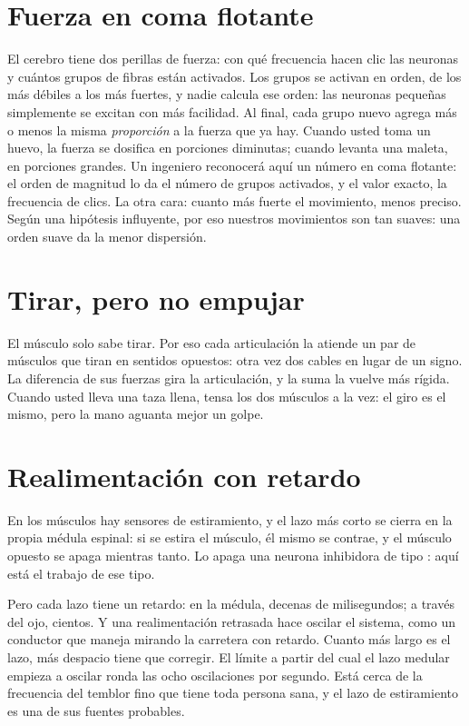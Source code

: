\section*{Fuerza en coma flotante}

El cerebro tiene dos perillas de fuerza: con qué frecuencia hacen clic las neuronas y cuántos grupos de fibras están activados. Los grupos se activan en orden, de los más débiles a los más fuertes, y nadie calcula ese orden: las neuronas pequeñas simplemente se excitan con más facilidad. Al final, cada grupo nuevo agrega más o menos la misma \emph{proporción} a la fuerza que ya hay. Cuando usted toma un huevo, la fuerza se dosifica en porciones diminutas; cuando levanta una maleta, en porciones grandes. Un ingeniero reconocerá aquí un número en coma flotante: el orden de magnitud lo da el número de grupos activados, y el valor exacto, la frecuencia de clics. La otra cara: cuanto más fuerte el movimiento, menos preciso. Según una hipótesis influyente, por eso nuestros movimientos son tan suaves: una orden suave da la menor dispersión.

\section*{Tirar, pero no empujar}

El músculo solo sabe tirar. Por eso cada articulación la atiende un par de músculos que tiran en sentidos opuestos: otra vez dos cables en lugar de un signo. La diferencia de sus fuerzas gira la articulación, y la suma la vuelve más rígida. Cuando usted lleva una taza llena, tensa los dos músculos a la vez: el giro es el mismo, pero la mano aguanta mejor un golpe.


\section*{Realimentación con retardo}

En los músculos hay sensores de estiramiento, y el lazo más corto se cierra en la propia médula espinal: si se estira el músculo, él mismo se contrae, y el músculo opuesto se apaga mientras tanto. Lo apaga una neurona inhibidora de tipo : aquí está el trabajo de ese tipo.

Pero cada lazo tiene un retardo: en la médula, decenas de milisegundos; a través del ojo, cientos. Y una realimentación retrasada hace oscilar el sistema, como un conductor que maneja mirando la carretera con retardo. Cuanto más largo es el lazo, más despacio tiene que corregir. El límite a partir del cual el lazo medular empieza a oscilar ronda las ocho oscilaciones por segundo. Está cerca de la frecuencia del temblor fino que tiene toda persona sana, y el lazo de estiramiento es una de sus fuentes probables.

